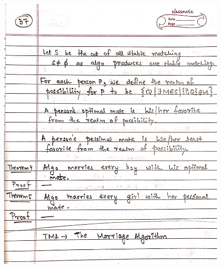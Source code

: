 \begin{figure}[H]
    \centering
    \includegraphics[width=16cm, height=21cm]{"./MIT-6.042J/MIT-6042J-037"}
\end{figure}
\newpage
